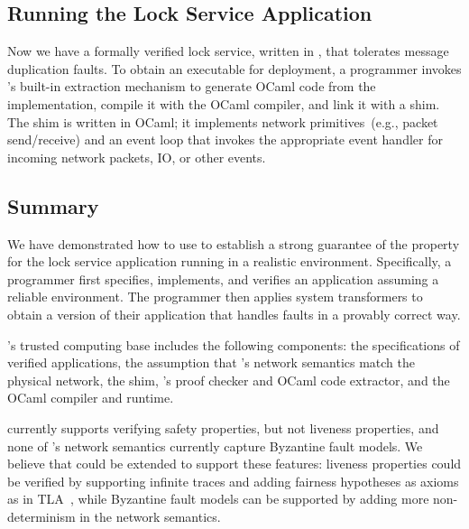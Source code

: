 \subsection{Running the Lock Service Application}

Now we have a formally verified lock service, written in \Coq,
that tolerates message duplication faults.
%
To obtain an executable for deployment, a \Verdi programmer invokes \Coq's
built-in extraction mechanism to generate OCaml code from the \Coq
implementation, compile it with the OCaml compiler, and link it with a
\Verdi shim.
%
The shim is written in OCaml; it implements network primitives~(e.g.,
packet send/receive) and an event loop that invokes the appropriate event
handler for incoming network packets, IO, or other events.

\subsection{Summary}

We have demonstrated how to use \Verdi to establish a strong guarantee of
the  property for the lock service application running in a
realistic environment.
%
Specifically, a programmer first specifies, implements, and verifies an
application assuming a reliable environment.
%
The programmer then applies system transformers to obtain a version of
their application that handles faults in a provably correct way.

\Verdi's trusted computing base includes the following components: the
specifications of verified applications, the assumption that \Verdi's
network semantics match the physical network, the \Verdi shim, \Coq's
proof checker and OCaml code extractor, and the OCaml compiler and
runtime.

\Verdi currently supports verifying safety properties, but not liveness
properties, and none of \Verdi's network semantics currently capture
Byzantine fault models.
%
We believe that \Verdi could be extended to support these features:
liveness properties could be verified by supporting infinite traces and
adding fairness hypotheses as axioms as in TLA~\cite{lamport:tla}, while
Byzantine fault models can be supported by adding more non-determinism in
the network semantics.


